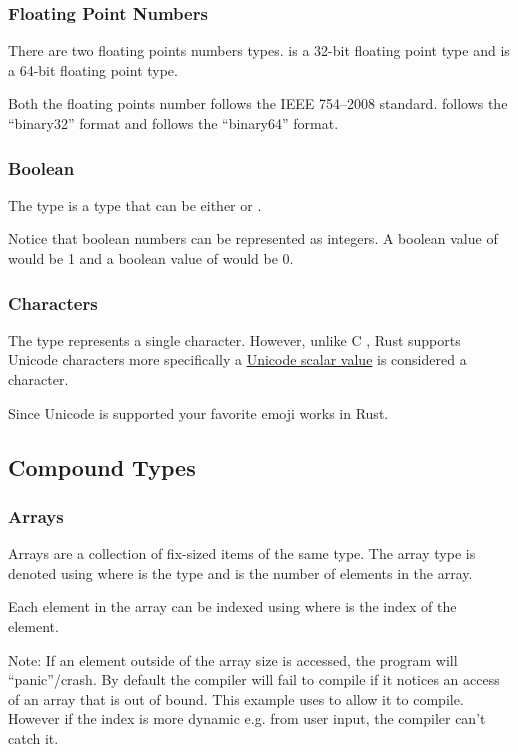 \documentclass{beamer}
\begin{document}
\begin{frame}
  \frametitle{Floating Point Numbers}
  There are two floating points numbers types.  is a 32-bit floating point type and  is a 64-bit floating point type.

  Both the floating points number follows the IEEE 754--2008 standard.  follows the ``binary32'' format and  follows the ``binary64'' format.
  
\end{frame}

\begin{frame}
  \frametitle{Boolean}
  The  type is a type that can be either  or .
  
  \alert{Notice} that boolean numbers can be represented as integers. A boolean value of  would be 1 and a boolean value of  would be 0.
\end{frame}

\begin{frame}
  \frametitle{Characters}
  The  type represents a single character. However, unlike C , Rust  supports Unicode characters more specifically a \href{https://www.unicode.org/glossary/\#unicode_scalar_value}{Unicode scalar value} is considered a character.

  Since Unicode is supported your favorite emoji works in Rust.
\end{frame}

\subsection{Compound Types}
\begin{frame}[allowframebreaks]
  \frametitle{Arrays}
  Arrays are a collection of fix-sized items of the same type. The array type is denoted using \inlinecode{[T;\@ N]} where  is the type and  is the number of elements in the array.
  

  Each element in the array can be indexed using \inlinecode{[i]} where  is the index of the element.
  

  \alert{Note:} If an element outside of the array size is accessed, the program will ``panic''/crash. By default the compiler will fail to compile if it notices an access of an array that is out of bound. This example uses  to allow it to compile. However if the index is more dynamic e.g. from user input, the compiler can't catch it.
  
\end{frame}
\end{document}
